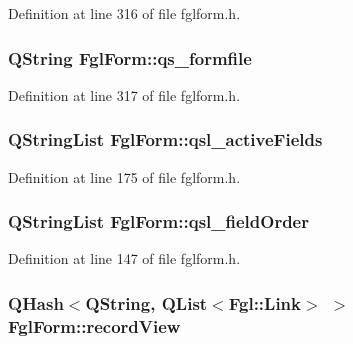 Definition at line 316 of file fglform.h.

\hypertarget{classFglForm_a1bca5dcb62f50a5939c295b7c0d662d2}{
\subsubsection[{qs\_\-formfile}]{\setlength{\rightskip}{0pt plus 5cm}QString {\bf FglForm::qs\_\-formfile}}}
\label{classFglForm_a1bca5dcb62f50a5939c295b7c0d662d2}


Definition at line 317 of file fglform.h.

\hypertarget{classFglForm_a127a846458930510880fd13eb07d4463}{
\subsubsection[{qsl\_\-activeFields}]{\setlength{\rightskip}{0pt plus 5cm}QStringList {\bf FglForm::qsl\_\-activeFields}}}
\label{classFglForm_a127a846458930510880fd13eb07d4463}


Definition at line 175 of file fglform.h.

\hypertarget{classFglForm_ab53b016e506ad4ed7fdb2ac2210d43b1}{
\subsubsection[{qsl\_\-fieldOrder}]{\setlength{\rightskip}{0pt plus 5cm}QStringList {\bf FglForm::qsl\_\-fieldOrder}}}
\label{classFglForm_ab53b016e506ad4ed7fdb2ac2210d43b1}


Definition at line 147 of file fglform.h.

\hypertarget{classFglForm_a2e8895a4cd6f58cc36f31c8a51c06a54}{
\subsubsection[{recordView}]{\setlength{\rightskip}{0pt plus 5cm}QHash$<$QString, QList$<${\bf Fgl::Link}$>$ $>$ {\bf FglForm::recordView}}}
\label{classFglForm_a2e8895a4cd6f58cc36f31c8a51c06a54}


